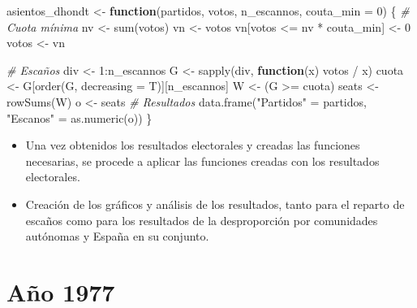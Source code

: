 \documentclass[12pt,a4paper,]{book}
\newenvironment{Shaded}{\begin{snugshade}}{\end{snugshade}}
\newcommand{\AttributeTok}[1]{\textcolor[rgb]{0.77,0.63,0.00}{#1}}
\newcommand{\CommentTok}[1]{\textcolor[rgb]{0.56,0.35,0.01}{\textit{#1}}}
\newcommand{\ControlFlowTok}[1]{\textcolor[rgb]{0.13,0.29,0.53}{\textbf{#1}}}
\newcommand{\DecValTok}[1]{\textcolor[rgb]{0.00,0.00,0.81}{#1}}
\newcommand{\FunctionTok}[1]{\textcolor[rgb]{0.00,0.00,0.00}{#1}}
\newcommand{\NormalTok}[1]{#1}
\newcommand{\OtherTok}[1]{\textcolor[rgb]{0.56,0.35,0.01}{#1}}
\newcommand{\SpecialCharTok}[1]{\textcolor[rgb]{0.00,0.00,0.00}{#1}}
\newcommand{\StringTok}[1]{\textcolor[rgb]{0.31,0.60,0.02}{#1}}
\numberwithin{dummy}{section}
\theoremstyle{ocrenumbox}
\theoremstyle{blacknumex}
\theoremstyle{blacknumbox}
\theoremstyle{ocrenum}
\theoremstyle{ocrenum}
\begin{document}
\pagebreak

\begin{Shaded}
\begin{Highlighting}[]
\NormalTok{asientos\_dhondt }\OtherTok{\textless{}{-}} \ControlFlowTok{function}\NormalTok{(partidos, votos,}
\NormalTok{                            n\_escannos,}
                            \AttributeTok{couta\_min =} \DecValTok{0}\NormalTok{) \{}
  \CommentTok{\# Cuota mínima}
\NormalTok{  nv }\OtherTok{\textless{}{-}} \FunctionTok{sum}\NormalTok{(votos)}
\NormalTok{  vn }\OtherTok{\textless{}{-}}\NormalTok{ votos}
\NormalTok{  vn[votos }\SpecialCharTok{\textless{}=}\NormalTok{ nv }\SpecialCharTok{*}\NormalTok{ couta\_min] }\OtherTok{\textless{}{-}} \DecValTok{0}
\NormalTok{  votos }\OtherTok{\textless{}{-}}\NormalTok{ vn}

  \CommentTok{\# Escaños}
\NormalTok{  div }\OtherTok{\textless{}{-}} \DecValTok{1}\SpecialCharTok{:}\NormalTok{n\_escannos}
\NormalTok{  G }\OtherTok{\textless{}{-}} \FunctionTok{sapply}\NormalTok{(div, }\ControlFlowTok{function}\NormalTok{(x) votos }\SpecialCharTok{/}\NormalTok{ x)}
\NormalTok{  cuota }\OtherTok{\textless{}{-}}\NormalTok{ G[}\FunctionTok{order}\NormalTok{(G, }\AttributeTok{decreasing =}\NormalTok{ T)][n\_escannos]}
\NormalTok{  W }\OtherTok{\textless{}{-}}\NormalTok{ (G }\SpecialCharTok{\textgreater{}=}\NormalTok{ cuota)}
\NormalTok{  seats }\OtherTok{\textless{}{-}} \FunctionTok{rowSums}\NormalTok{(W)}
\NormalTok{  o }\OtherTok{\textless{}{-}}\NormalTok{ seats}
  \CommentTok{\# Resultados}
  \FunctionTok{data.frame}\NormalTok{(}\StringTok{"Partidos"} \OtherTok{=}\NormalTok{ partidos, }\StringTok{"Escanos"} \OtherTok{=} \FunctionTok{as.numeric}\NormalTok{(o))}
\NormalTok{\}}
\end{Highlighting}
\end{Shaded}

\begin{itemize}
\item
  Una vez obtenidos los resultados electorales y creadas las funciones
  necesarias, se procede a aplicar las funciones creadas con los
  resultados electorales.
\item
  Creación de los gráficos y análisis de los resultados, tanto para el
  reparto de escaños como para los resultados de la desproporción por
  comunidades autónomas y España en su conjunto.
\end{itemize}

\newpage

\hypertarget{auxf1o-1977}{%
\section{Año 1977}\label{auxf1o-1977}}
\end{document}

